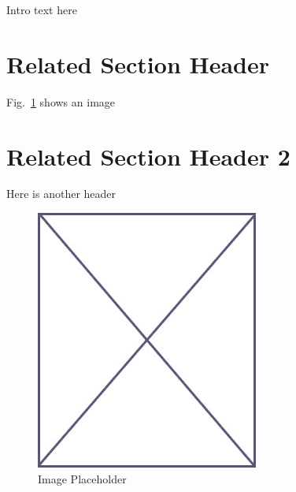 Intro text here

\section{Related Section Header}
\label{sec:related_sec_1}

Fig.~\ref{fig:placeholder_related} shows an image

\section{Related Section Header 2}
\label{sec:related_sec_2}

Here is another header


\begin{figure}
\begin{center}
\vspace{-32pt}
\includegraphics[scale=.45]{figs/placeholder}
\end{center}
\vspace{-12pt}
\caption{Image Placeholder}
\label{fig:placeholder_related}
\end{figure}
